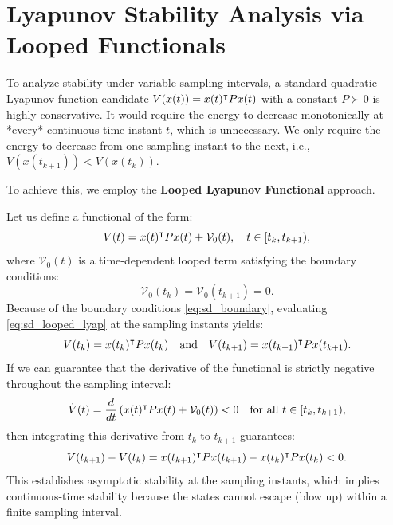 \section{Lyapunov Stability Analysis via Looped Functionals}
To analyze stability under variable sampling intervals, a standard quadratic Lyapunov function candidate $V(x(t)) = x(t)^\intercal P x(t)$ with a constant $P \succ 0$ is highly conservative. It would require the energy to decrease monotonically at *every* continuous time instant $t$, which is unnecessary. We only require the energy to decrease from one sampling instant to the next, i.e., $V(x(t_{k+1})) < V(x(t_k))$.

To achieve this, we employ the \textbf{Looped Lyapunov Functional} approach.

Let us define a functional of the form:
\begin{equation}
    V(t) = x(t)^\intercal P x(t) + \mathcal{V}_0(t), \quad t \in [t_k, t_{k+1}) , \label{eq:sd_looped_lyap}
\end{equation}
where $\mathcal{V}_0(t)$ is a time-dependent looped term satisfying the boundary conditions:
\begin{equation}
    \mathcal{V}_0(t_k) = \mathcal{V}_0(t_{k+1}) = 0 . \label{eq:sd_boundary}
\end{equation}
Because of the boundary conditions \eqref{eq:sd_boundary}, evaluating \eqref{eq:sd_looped_lyap} at the sampling instants yields:
\begin{equation}
V(t_k) = x(t_k)^\intercal P x(t_k) \quad \text{and} \quad V(t_{k+1}) = x(t_{k+1})^\intercal P x(t_{k+1}) .
\end{equation}
If we can guarantee that the derivative of the functional is strictly negative throughout the sampling interval:
\begin{equation}
\dot{V}(t) = \frac{d}{dt} \left( x(t)^\intercal P x(t) + \mathcal{V}_0(t) \right) < 0 \quad \text{for all } t \in [t_k, t_{k+1}) ,
\end{equation}
then integrating this derivative from $t_k$ to $t_{k+1}$ guarantees:
\begin{equation}
V(t_{k+1}) - V(t_k) = x(t_{k+1})^\intercal P x(t_{k+1}) - x(t_k)^\intercal P x(t_k) < 0 .
\end{equation}
This establishes asymptotic stability at the sampling instants, which implies continuous-time stability because the states cannot escape (blow up) within a finite sampling interval.

